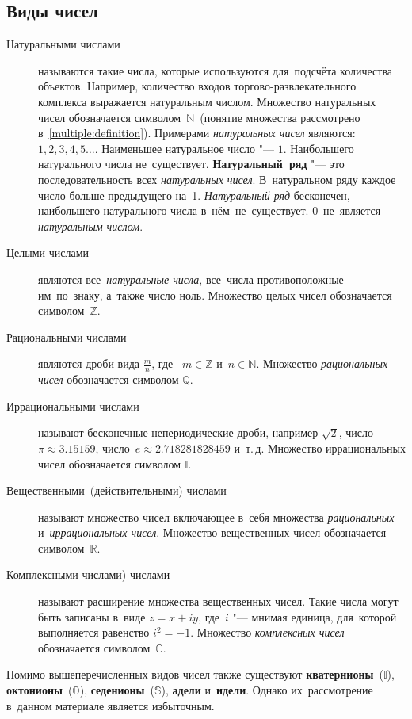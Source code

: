 \documentclass[]{scrartcl}
\begin{document}
\subsection{Виды чисел}
\begin{description}
	\item[Натуральными числами] называются такие числа, которые используются для~подсчёта количества объектов. Например, количество входов торгово-развлекательного комплекса выражается натуральным числом. Множество натуральных чисел обозначается символом~$\mathbb{N}$~(понятие множества рассмотрено в~\ref{multiple:definition}). Примерами \emph{натуральных чисел} являются:~$1, 2, 3, 4, 5\ldots$. Наименьшее натуральное число "--- $1$. Наибольшего натурального числа не~существует. \textbf{Натуральный~ряд} "--- это последовательность всех \emph{натуральных чисел}. В~натуральном ряду каждое число больше предыдущего на~1. \emph{Натуральный ряд} бесконечен, наибольшего натурального числа в~нём~не~существует. $0$~не~является \emph{натуральным числом}.
	\item[Целыми числами] являются все~\emph{натуральные числа}, все~числа противоположные им~по~знаку, а~также число ноль. Множество целых чисел обозначается символом~$\mathbb{Z}$.
	\item[Рациональными числами] являются дроби вида $\frac{m}{n}$, где~ $m \in \mathbb{Z}$ и~$n \in \mathbb{N}$. Множество \emph{рациональных чисел} обозначается символом $\mathbb{Q}$.
	\item[Иррациональными числами] называют бесконечные непериодические дроби, например $\sqrt{2}$, число $\pi \approx 3.15159$, число~$e \approx 2.718281828459$ и~т.\,д. Множество иррациональных чисел обозначается символом $\mathbb{I}$.
	\item[Вещественными~(действительными) числами] называют множество чисел включающее в~себя множества \emph{рациональных} и~\emph{иррациональных чисел}. Множество вещественных чисел обозначается символом~$\mathbb{R}$.
	\item[Комплексными числами) числами] называют расширение множества вещественных чисел. Такие числа могут быть записаны в~виде $z=x+iy$, где~$i$ "--- мнимая единица, для~которой выполняется равенство $i^2=-1$. Множество \emph{комплексных чисел} обозначается символом~$\mathbb{C}$.
\end{description} 
Помимо вышеперечисленных видов чисел также существуют \textbf{кватернионы}~($\mathbb{I}$), \textbf{октонионы}~($\mathbb{O}$), \textbf{седенионы}~($\mathbb{S}$), \textbf{адели} и~\textbf{идели}. Однако их~рассмотрение в~данном материале является избыточным. 
\end{document}
